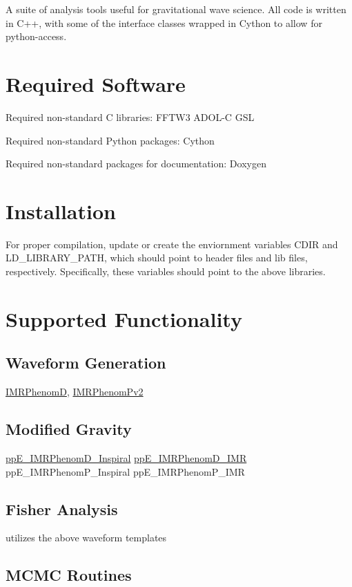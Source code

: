 A suite of analysis tools useful for gravitational wave science. All code is written in C++, with some of the interface classes wrapped in Cython to allow for python-\/access.\hypertarget{index_external_libs}{}\section{Required Software}\label{index_external_libs}
Required non-\/standard C libraries\+: F\+F\+T\+W3 A\+D\+O\+L-\/C G\+SL

Required non-\/standard Python packages\+: Cython

Required non-\/standard packages for documentation\+: Doxygen\hypertarget{index_installation}{}\section{Installation}\label{index_installation}
For proper compilation, update or create the enviornment variables C\+D\+IR and L\+D\+\_\+\+L\+I\+B\+R\+A\+R\+Y\+\_\+\+P\+A\+TH, which should point to header files and lib files, respectively. Specifically, these variables should point to the above libraries.\hypertarget{index_functionality}{}\section{Supported Functionality}\label{index_functionality}
\hypertarget{index_wave_gen}{}\subsection{Waveform Generation}\label{index_wave_gen}
\hyperlink{classIMRPhenomD}{I\+M\+R\+PhenomD}, \hyperlink{classIMRPhenomPv2}{I\+M\+R\+Phenom\+Pv2}\hypertarget{index_mod_grav}{}\subsection{Modified Gravity}\label{index_mod_grav}
\hyperlink{classppE__IMRPhenomD__Inspiral}{pp\+E\+\_\+\+I\+M\+R\+Phenom\+D\+\_\+\+Inspiral} \hyperlink{classppE__IMRPhenomD__IMR}{pp\+E\+\_\+\+I\+M\+R\+Phenom\+D\+\_\+\+I\+MR} pp\+E\+\_\+\+I\+M\+R\+Phenom\+P\+\_\+\+Inspiral pp\+E\+\_\+\+I\+M\+R\+Phenom\+P\+\_\+\+I\+MR\hypertarget{index_fisher}{}\subsection{Fisher Analysis}\label{index_fisher}
utilizes the above waveform templates\hypertarget{index_mcmc}{}\subsection{M\+C\+M\+C Routines}\label{index_mcmc}
